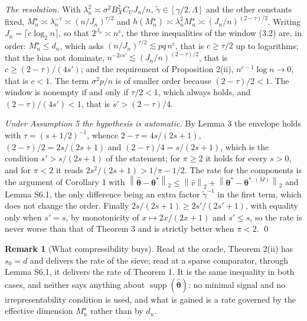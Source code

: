 \documentclass[10pt]{book}
\theoremstyle{definition}
\newtheorem{remark}{Remark}[section]
\newcommand{\norm}[1]{\left\lVert #1 \right\rVert}
\newcommand{\btheta}{\boldsymbol{\theta}}
\newcommand{\thetastar}{\btheta^{*}}
\newcommand{\thetahat}{\widehat{\btheta}}
\newcommand{\penn}{\lambda_{n}}
\newcommand{\seff}{s'}
\newcommand{\gtil}{\widetilde{\gamma}}
\newcommand{\Mstar}{M^{\star}}
\newcommand{\thstarM}[1]{\btheta^{*,(#1)}}
\DeclareMathOperator{\supp}{supp}
\begin{document}
\emph{The resolution.} With $\penn^2 \asymp \sigma^2B_X^2C_UJ_n/n$,
$\gtil \in [\gamma/2,\Lambda]$ and the other constants fixed,
$\Mstar_n \asymp \penn^{-\tau} \asymp (n/J_n)^{\tau/2}$ and
$h(\Mstar_n) \asymp \penn^2\Mstar_n \asymp (J_n/n)^{(2-\tau)/2}$. Writing
$J_n = \lceil c\log_2 n\rceil$, so that $2^{J_n} \asymp n^{c}$, the three
inequalities of the window (3.2) are, in order: $\Mstar_n \le d_n$, which asks
$(n/J_n)^{\tau/2} \lesssim pq\,n^{c}$, that is $c \ge \tau/2$ up to
logarithms; that the bias not dominate, $n^{-2c\seff} \lesssim
(J_n/n)^{(2-\tau)/2}$, that is $c \ge (2-\tau)/(4\seff)$; and the requirement
of Proposition 2(ii), $n^{c-1}\log n \to 0$, that is $c<1$. The term
$\sigma^2p/n$ is of smaller order because $(2-\tau)/2<1$. The window is
nonempty if and only if $\tau/2<1$, which always holds, and
$(2-\tau)/(4\seff)<1$, that is $\seff>(2-\tau)/4$.

\emph{Under Assumption 5 the hypothesis is automatic.} By Lemma 3 the
envelope holds with $\tau = (s+1/2)^{-1}$, whence $2-\tau = 4s/(2s+1)$,
$(2-\tau)/2 = 2s/(2s+1)$ and $(2-\tau)/4 = s/(2s+1)$, which is the condition
$\seff>s/(2s+1)$ of the statement; for $\pi \ge 2$ it holds for every $s>0$,
and for $\pi<2$ it reads $2s^2/(2s+1)>1/\pi-1/2$. The rate for the components
is the argument of Corollary 1 with
$\norm{\thetahat-\thetastar}_2 \le \norm{\bar v}_2 +
\norm{\thetastar-\thstarM{M}}_2$ and Lemma S6.1, the only difference being an
extra factor $\gtil^{-1}$ in the first term, which does not change the order.
Finally $2s/(2s+1) \ge 2\seff/(2\seff+1)$, with equality only when
$\seff = s$, by monotonicity of $x \mapsto 2x/(2x+1)$ and $\seff \le s$, so
the rate is never worse than that of Theorem 3 and is strictly better when
$\pi<2$. \qed

\begin{remark}[What compressibility buys]
\label{rem:s0}
Read at the oracle, Theorem 2(ii) has $s_0 = d$ and delivers the rate of the
sieve; read at a sparse comparator, through Lemma S6.1, it delivers the rate
of Theorem 1. It is the same inequality in both cases, and neither says
anything about $\supp(\thetahat)$: no minimal signal and no
irrepresentability condition is used, and what is gained is a rate governed by
the effective dimension $\Mstar_n$ rather than by $d_n$.
\end{remark}

\bibhang=1.7pc
\bibsep=2pt
\fontsize{9}{14pt plus.8pt minus .6pt}\selectfont
\renewcommand\bibname{\large \bf References}


\end{document}
